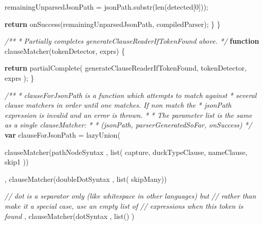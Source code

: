 \documentclass[12pt, ]{article}
\newenvironment{Shaded}{}{}
\newcommand{\KeywordTok}[1]{\textcolor[rgb]{0.00,0.44,0.13}{\textbf{{#1}}}}
\newcommand{\DecValTok}[1]{\textcolor[rgb]{0.25,0.63,0.44}{{#1}}}
\newcommand{\CommentTok}[1]{\textcolor[rgb]{0.38,0.63,0.69}{\textit{{#1}}}}
\newcommand{\OtherTok}[1]{\textcolor[rgb]{0.00,0.44,0.13}{{#1}}}
\newcommand{\FunctionTok}[1]{\textcolor[rgb]{0.02,0.16,0.49}{{#1}}}
\newcommand{\NormalTok}[1]{{#1}}
\begin{document}
\begin{Shaded}
\begin{Highlighting}[]
             \NormalTok{remainingUnparsedJsonPath = }\OtherTok{jsonPath}\NormalTok{.}\FunctionTok{substr}\NormalTok{(}\FunctionTok{len}\NormalTok{(detected[}\DecValTok{0}\NormalTok{]));                }
                               
         \KeywordTok{return} \FunctionTok{onSuccess}\NormalTok{(remainingUnparsedJsonPath, compiledParser);}
      \NormalTok{\}         }
   \NormalTok{\}}
                 
   \CommentTok{/**}
\CommentTok{    * Partially completes generateClauseReaderIfTokenFound above. }
\CommentTok{    */}
   \KeywordTok{function} \FunctionTok{clauseMatcher}\NormalTok{(tokenDetector, exprs) \{}
        
      \KeywordTok{return}   \FunctionTok{partialComplete}\NormalTok{( }
                  \NormalTok{generateClauseReaderIfTokenFound, }
                  \NormalTok{tokenDetector, }
                  \NormalTok{exprs }
               \NormalTok{);}
   \NormalTok{\}}

   \CommentTok{/**}
\CommentTok{    * clauseForJsonPath is a function which attempts to match against }
\CommentTok{    * several clause matchers in order until one matches. If non match the}
\CommentTok{    * jsonPath expression is invalid and an error is thrown.}
\CommentTok{    * }
\CommentTok{    * The parameter list is the same as a single clauseMatcher:}
\CommentTok{    * }
\CommentTok{    *    (jsonPath, parserGeneratedSoFar, onSuccess)}
\CommentTok{    */}     
   \KeywordTok{var} \NormalTok{clauseForJsonPath = }\FunctionTok{lazyUnion}\NormalTok{(}

      \FunctionTok{clauseMatcher}\NormalTok{(pathNodeSyntax   , }\FunctionTok{list}\NormalTok{( capture, }
                                             \NormalTok{duckTypeClause, }
                                             \NormalTok{nameClause, }
                                             \NormalTok{skip1 ))}
                                                     
   \NormalTok{,  }\FunctionTok{clauseMatcher}\NormalTok{(doubleDotSyntax  , }\FunctionTok{list}\NormalTok{( skipMany))}
       
       \CommentTok{// dot is a separator only (like whitespace in other languages) but }
       \CommentTok{// rather than make it a special case, use an empty list of }
       \CommentTok{// expressions when this token is found}
   \NormalTok{,  }\FunctionTok{clauseMatcher}\NormalTok{(dotSyntax        , }\FunctionTok{list}\NormalTok{() )  }
                                                                                      

\end{Highlighting}
\end{Shaded}
\end{document}
